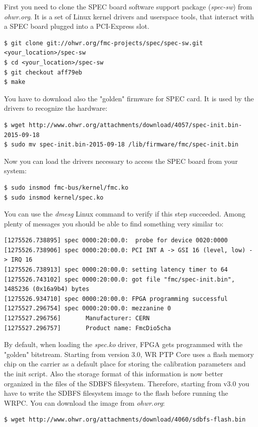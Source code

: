 \documentclass[a4paper, 12pt]{article}
\newcommand{\codeHook}[1]{\mbox{\ttfamily\MakeTextUppercase{#1}}}
\begin{document}
First you need to clone the SPEC board software support package
(\textit{spec-sw}) from \textit{ohwr.org}. It is a set of Linux kernel drivers and
userspace tools, that interact with a SPEC board plugged into a PCI-Express
slot.\\

\begin{lstlisting}
$ git clone git://ohwr.org/fmc-projects/spec/spec-sw.git <your_location>/spec-sw
$ cd <your_location>/spec-sw
$ git checkout aff79eb
$ make
\end{lstlisting}

You have to download also the "golden" firmware for SPEC card. It is used by
the drivers to recognize the hardware:
\begin{lstlisting}
$ wget http://www.ohwr.org/attachments/download/4057/spec-init.bin-2015-09-18
$ sudo mv spec-init.bin-2015-09-18 /lib/firmware/fmc/spec-init.bin
\end{lstlisting}

Now you can load the drivers necessary to access the SPEC board from your
system:
\begin{lstlisting}
$ sudo insmod fmc-bus/kernel/fmc.ko
$ sudo insmod kernel/spec.ko
\end{lstlisting}

You can use the \textit{dmesg} Linux command to verify if this step succeeded.
Among plenty of messages you should be able to find something very similar to:
\begin{lstlisting}[basicstyle=\tiny]
[1275526.738895] spec 0000:20:00.0:  probe for device 0020:0000
[1275526.738906] spec 0000:20:00.0: PCI INT A -> GSI 16 (level, low) -> IRQ 16
[1275526.738913] spec 0000:20:00.0: setting latency timer to 64
[1275526.743102] spec 0000:20:00.0: got file "fmc/spec-init.bin", 1485236 (0x16a9b4) bytes
[1275526.934710] spec 0000:20:00.0: FPGA programming successful
[1275527.296754] spec 0000:20:00.0: mezzanine 0
[1275527.296756]       Manufacturer: CERN
[1275527.296757]       Product name: FmcDio5cha
\end{lstlisting}


By default, when loading the \textit{spec.ko} driver, FPGA gets programmed with
the "golden" bitstream. Starting from version 3.0, WR PTP Core uses a flash
memory chip on the carrier as a default place for storing the calibration
parameters and the init script. Also the storage format of this information is
now better organized in the files of the SDBFS filesystem. Therefore, starting
from v3.0 you have to write the \codeHook{sdbfs} filesystem image to the flash
before running the WRPC. You can download the image from \textit{ohwr.org}:
\begin{lstlisting}
$ wget http://www.ohwr.org/attachments/download/4060/sdbfs-flash.bin
\end{lstlisting}
\end{document}

